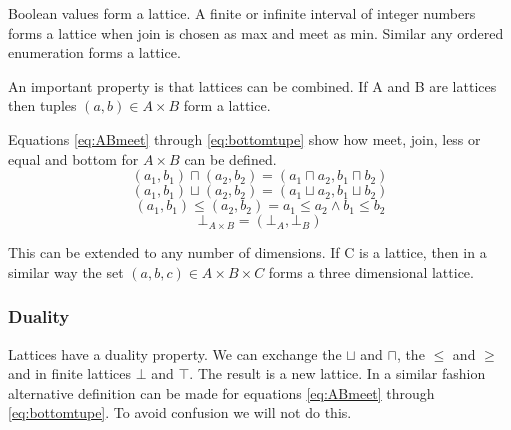 Boolean values form a lattice. 
A finite or infinite interval of integer numbers forms a lattice when join is chosen as max and meet as min.
Similar any ordered enumeration forms a lattice. 

An important property is that lattices can be combined. 
If A and B are lattices then tuples $(a, b) \in  A \times B$ form a lattice.

Equations \ref{eq:ABmeet} through \ref{eq:bottomtupe} show how meet, join, less or equal and bottom for $A \times B$ can be defined.
\begin{equation}
\label{eq:ABmeet}
(a_{1}, b_{1}) \sqcap (a_{2}, b_{2})  = ( a_{1} \sqcap a_{2}, b_{1} \sqcap b_{2}) 
\end {equation}
\begin{equation}
(a_{1}, b_{1}) \sqcup (a_{2}, b_{2})  = ( a_{1} \sqcup a_{2}, b_{1} \sqcup b_{2}) 
\end {equation}
\begin{equation}
(a_{1}, b_{1}) \leq (a_{2}, b_{2})  =  a_{1} \leq a_{2} \land   b_{1} \leq b_{2} 
\end {equation}
\begin{equation}
\label{eq:bottomtupe}
\bot_{A \times B}  =  (\bot_{A}, \bot_{B})
\end {equation}
 
This can be extended to any number of dimensions. 
If C is a lattice, then in a similar way the set $(a, b, c) \in A \times B \times C$ forms a three dimensional lattice.


\subsubsection{Duality} 
Lattices have a duality property.
We can exchange the $\sqcup$ and $\sqcap$, the $\leq$ and $\geq$ and in finite lattices $\bot$ and $\top$.
The result is a new lattice.
In a similar fashion alternative definition can be made for equations \ref{eq:ABmeet} through \ref{eq:bottomtupe}.
To avoid confusion we will not do this.




















